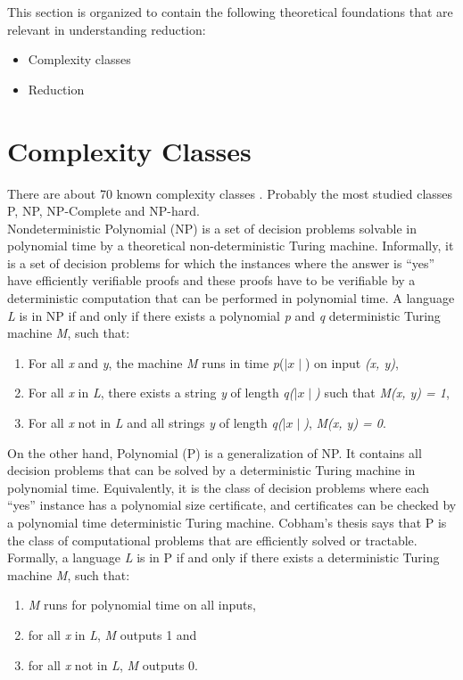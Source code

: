\documentclass[a4paper,oneside,11pt]{report}
\begin{document}
This section is organized to contain the following theoretical foundations that are relevant in understanding reduction:
\begin{itemize}
  \item Complexity classes
  \vspace{-0.5cm}
  \item Reduction
\end{itemize}

\section{Complexity Classes}
There are about 70 known complexity classes \cite{Arora}. Probably the most studied classes P, NP, NP-Complete and NP-hard.\\

Nondeterministic Polynomial (NP) is a set of decision problems solvable in polynomial time by a theoretical non-deterministic Turing machine. Informally, it is a set of decision problems for which the instances where the answer is “yes” have efficiently verifiable proofs and these proofs have to be verifiable by a deterministic computation that can be performed in polynomial time. A language \emph{L} is in NP if and only if there exists a polynomial \emph{p} and \emph{q} deterministic Turing machine \emph{M}, such that:
\begin{enumerate}
\item For all \emph{x} and \emph{y}, the machine \emph{M} runs in time \emph{p}($\mid x \mid$) on input \emph{(x, y)},
\item For all \emph{x} in \emph{L}, there exists a string \emph{y} of length \emph{q($\mid x \mid$)} such that \emph{M(x, y) = 1},
\item For all \emph{x} not in \emph{L} and all strings \emph{y} of length \emph{q($\mid x \mid$)}, \emph{M(x, y) = 0}.
\end{enumerate}
On the other hand, Polynomial (P) is a generalization of NP. It contains all decision problems that can be solved by a deterministic Turing machine in polynomial time. Equivalently, it is the class of decision problems where each “yes” instance has a polynomial size certificate, and certificates can be checked by a polynomial time deterministic Turing machine. Cobham’s thesis says that P is the class of computational problems that are efficiently solved or tractable. Formally, a language \emph{L} is in P if and only if there exists a deterministic Turing machine \emph{M}, such that:
\begin{enumerate}
\item \emph{M} runs for polynomial time on all inputs,
\item for all \emph{x} in \emph{L}, \emph{M} outputs 1 and
\item for all \emph{x} not in \emph{L}, \emph{M} outputs 0.
\end{enumerate}
\end{document}
